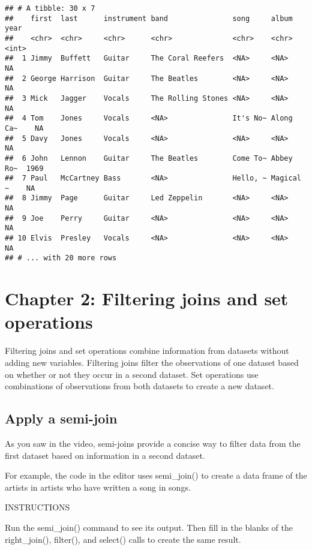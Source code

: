 \documentclass[]{article}
\begin{document}
\begin{verbatim}
## # A tibble: 30 x 7
##    first  last      instrument band               song     album      year
##    <chr>  <chr>     <chr>      <chr>              <chr>    <chr>     <int>
##  1 Jimmy  Buffett   Guitar     The Coral Reefers  <NA>     <NA>         NA
##  2 George Harrison  Guitar     The Beatles        <NA>     <NA>         NA
##  3 Mick   Jagger    Vocals     The Rolling Stones <NA>     <NA>         NA
##  4 Tom    Jones     Vocals     <NA>               It's No~ Along Ca~    NA
##  5 Davy   Jones     Vocals     <NA>               <NA>     <NA>         NA
##  6 John   Lennon    Guitar     The Beatles        Come To~ Abbey Ro~  1969
##  7 Paul   McCartney Bass       <NA>               Hello, ~ Magical ~    NA
##  8 Jimmy  Page      Guitar     Led Zeppelin       <NA>     <NA>         NA
##  9 Joe    Perry     Guitar     <NA>               <NA>     <NA>         NA
## 10 Elvis  Presley   Vocals     <NA>               <NA>     <NA>         NA
## # ... with 20 more rows
\end{verbatim}

\section{Chapter 2: Filtering joins and set
operations}\label{chapter-2-filtering-joins-and-set-operations}

Filtering joins and set operations combine information from datasets
without adding new variables. Filtering joins filter the observations of
one dataset based on whether or not they occur in a second dataset. Set
operations use combinations of observations from both datasets to create
a new dataset.

\subsection{Apply a semi-join}\label{apply-a-semi-join}

As you saw in the video, semi-joins provide a concise way to filter data
from the first dataset based on information in a second dataset.

For example, the code in the editor uses semi\_join() to create a data
frame of the artists in artists who have written a song in songs.

INSTRUCTIONS

Run the semi\_join() command to see its output. Then fill in the blanks
of the right\_join(), filter(), and select() calls to create the same
result.
\end{document}
